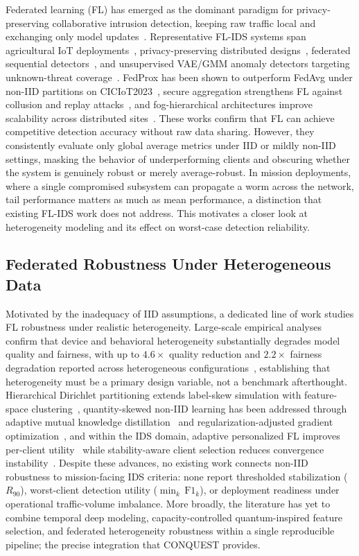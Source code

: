 \documentclass[conference]{IEEEtran}
\begin{document}
Federated learning (FL) has emerged as the dominant paradigm for
privacy-preserving collaborative intrusion detection, keeping raw
traffic local and exchanging only model updates~\cite{hamadsystematic}.
Representative FL-IDS systems span agricultural IoT
deployments~\cite{FRIHA202217}, privacy-preserving distributed
designs~\cite{amrosecuring}, federated sequential
detectors~\cite{selvamfederated,anweradvanced}, and unsupervised
VAE/GMM anomaly detectors targeting unknown-threat
coverage~\cite{camposfederated}. FedProx has been shown to outperform
FedAvg under non-IID partitions on CICIoT2023~\cite{herlambangfederated},
secure aggregation strengthens FL against collusion and replay
attacks~\cite{yaoenhanced}, and fog-hierarchical architectures improve
scalability across distributed sites~\cite{alsalehheterogeneity,islamprivacy}.
These works confirm that FL can achieve competitive detection accuracy
without raw data sharing. However, they consistently evaluate only
global average metrics under IID or mildly non-IID settings, masking
the behavior of underperforming clients and obscuring whether the
system is genuinely robust or merely average-robust. In mission
deployments, where a single compromised subsystem can propagate a
worm across the network, tail performance matters as much as mean
performance, a distinction that existing FL-IDS work does not
address. This motivates a closer look at heterogeneity modeling and
its effect on worst-case detection reliability.

\subsection{Federated Robustness Under Heterogeneous Data}

Motivated by the inadequacy of IID assumptions, a dedicated line of
work studies FL robustness under realistic heterogeneity. Large-scale
empirical analyses confirm that device and behavioral heterogeneity
substantially degrades model quality and fairness, with up to
$4.6\times$ quality reduction and $2.2\times$ fairness degradation
reported across heterogeneous
configurations~\cite{abdelmoniemcomprehensive}, establishing that
heterogeneity must be a primary design variable, not a benchmark
afterthought. Hierarchical Dirichlet partitioning extends label-skew
simulation with feature-space
clustering~\cite{arisdakessiantwo}, quantity-skewed non-IID learning
has been addressed through adaptive mutual knowledge
distillation~\cite{gefedamkd} and regularization-adjusted gradient
optimization~\cite{chaaddressing}, and within the IDS domain,
adaptive personalized FL improves per-client
utility~\cite{almansouradaptive} while stability-aware client
selection reduces convergence
instability~\cite{vinothinienhancing}. Despite these advances, no
existing work connects non-IID robustness to mission-facing IDS
criteria: none report thresholded stabilization ($R_{90}$),
worst-client detection utility ($\min_k\,\mathrm{F1}_k$), or
deployment readiness under operational traffic-volume imbalance.
More broadly, the literature has yet to combine temporal deep
modeling, capacity-controlled quantum-inspired feature selection,
and federated heterogeneity robustness within a single reproducible
pipeline; the precise integration that CONQUEST provides.
\end{document}

